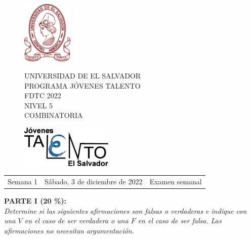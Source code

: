 \documentclass[12pt]{article}
\newcommand{\tema}{Semana 1}
\newcommand{\fecha}{Sábado, 3 de diciembre de 2022}
\newcommand{\sesion}{Examen semanal}
\begin{document}
\thispagestyle{empty}

\begin{figure}[h] 
	\begin{minipage}[b]{0.26\textwidth}
		\begin{center}
			\includegraphics[height=3cm]{Logos/UES.png}
			\par\end{center}
	\end{minipage} 
	\begin{minipage}[b]{0.46\textwidth}
		\begin{center}
			UNIVERSIDAD DE EL SALVADOR\\ [0.1cm]
			PROGRAMA JÓVENES TALENTO\\ [0.1cm]
	        FDTC 2022\\ [0.1cm]
                NIVEL 5\\ [0.1cm]
			COMBINATORIA 
			\par\end{center}
	\end{minipage} 
	\begin{minipage}[b]{0.05\textwidth}
		\begin{center}
			\includegraphics[height=2cm]{Logos/LOGO PJT.png}
			\par\end{center}
	\end{minipage}
\end{figure}

\begin{center}
    \begin{tabular}{p{4.5cm} p{7cm} p{4.5cm}}
        \tema & \centering\fecha & \hfill\sesion
    \end{tabular}
\end{center}



{\bf PARTE I (20 \%):}\\
\textit{Determine si las siguientes afirmaciones son falsas o verdaderas e indique con una $V$ en el caso de ser verdadera o una $F$ en el caso de ser falsa. Las afirmaciones no necesitan argumentación.}
\end{document}
